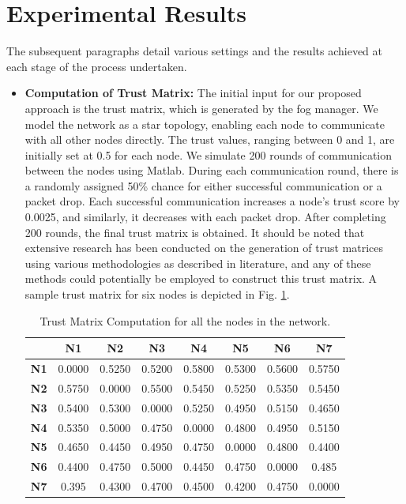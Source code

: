 \documentclass{sn-jnl}%
\begin{document}
\section{Experimental Results}
The subsequent paragraphs detail various settings and the results achieved at each stage of the process undertaken.
\begin{itemize}
\item \textbf{Computation of Trust Matrix:} The initial input for our proposed approach is the trust matrix, which is generated by the fog manager. We model the network as a star topology, enabling each node to communicate with all other nodes directly. The trust values, ranging between 0 and 1, are initially set at 0.5 for each node. We simulate 200 rounds of communication between the nodes using Matlab. During each communication round, there is a randomly assigned 50\% chance for either successful communication or a packet drop. Each successful communication increases a node’s trust score by 0.0025, and similarly, it decreases with each packet drop. After completing 200 rounds, the final trust matrix is obtained. It should be noted that extensive research has been conducted on the generation of trust matrices using various methodologies as described in literature\cite{caminha2018smart,najib2019survey}, and any of these methods could potentially be employed to construct this trust matrix. A sample trust matrix for six nodes is depicted in Fig. \ref{tab:trust_matrix}.

    
\begin{table}[htbp]
\centering
\renewcommand{\arraystretch}{1.5} %
\caption{Trust Matrix Computation for all the nodes in  the network.}
\label{tab:trust_matrix}
\begin{tabular}{|c|c|c|c|c|c|c|c|}
\hline
\textbf{} & \textbf{N1} & \textbf{N2} & \textbf{N3} & \textbf{N4} & \textbf{N5} & \textbf{N6} & \textbf{N7}\\
\hline
\textbf{N1} & 0.0000 & 0.5250 & 0.5200 & 0.5800 &0.5300 &0.5600 & 0.5750 \\
\hline
\textbf{N2} & 0.5750 & 0.0000 & 0.5500 & 0.5450 & 0.5250 & 0.5350 & 0.5450\\
\hline
\textbf{N3} & 0.5400 &0.5300 & 0.0000 & 0.5250 & 0.4950 & 0.5150 & 0.4650 \\
\hline
\textbf{N4} & 0.5350 & 0.5000 & 0.4750 & 0.0000 & 0.4800 & 0.4950 & 0.5150 \\
\hline
\textbf{N5} & 0.4650 & 0.4450 & 0.4950 & 0.4750 & 0.0000 & 0.4800 & 0.4400\\
\hline
\textbf{N6} & 0.4400 & 0.4750 & 0.5000 & 0.4450 & 0.4750 & 0.0000 & 0.485\\
\hline
\textbf{N7} & 0.395 & 0.4300 & 0.4700 & 0.4500 & 0.4200  & 0.4750 & 0.0000\\
\hline
\end{tabular}
\end{table}



\end{itemize}
\end{document}
